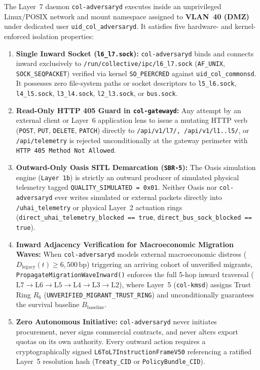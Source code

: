 \begin{invariant}
\label{inv:l7-dmz-containment}
The Layer~7 daemon \texttt{col-adversaryd} executes inside an unprivileged Linux/POSIX network and mount namespace assigned to \textbf{VLAN~40 (DMZ)} under dedicated user \texttt{uid\_col\_adversaryd}. It satisfies five hardware- and kernel-enforced isolation properties:
\begin{enumerate}
    \item \textbf{Single Inward Socket (\texttt{l6\_l7.sock}):} \texttt{col-adversaryd} binds and connects inward exclusively to \texttt{/run/collective/ipc/l6\_l7.sock} (\texttt{AF\_UNIX}, \texttt{SOCK\_SEQPACKET}) verified via kernel \texttt{SO\_PEERCRED} against \texttt{uid\_col\_commonsd}. It possesses zero file-system paths or socket descriptors to \texttt{l5\_l6.sock}, \texttt{l4\_l5.sock}, \texttt{l3\_l4.sock}, \texttt{l2\_l3.sock}, or \texttt{bus.sock}.
    \item \textbf{Read-Only HTTP 405 Guard in \texttt{col-gatewayd}:} Any attempt by an external client or Layer~6 application lens to issue a mutating HTTP verb (\texttt{POST}, \texttt{PUT}, \texttt{DELETE}, \texttt{PATCH}) directly to \texttt{/api/v1/l7/\textit{}, \texttt{/api/v1/l1..l5/}}, or \texttt{/api/telemetry} is rejected unconditionally at the gateway perimeter with \texttt{HTTP 405 Method Not Allowed}.
    \item \textbf{Outward-Only Oasis SITL Demarcation (\texttt{SBR-5}):} The Oasis simulation engine (\texttt{Layer~1b}) is strictly an outward producer of simulated physical telemetry tagged \texttt{QUALITY\_SIMULATED = 0x01}. Neither Oasis nor \texttt{col-adversaryd} ever writes simulated or external packets directly into \texttt{/uhai\_telemetry} or physical Layer~2 actuation rings (\texttt{direct\_uhai\_telemetry\_blocked == true}, \texttt{direct\_bus\_sock\_blocked == true}).
    \item \textbf{Inward Adjacency Verification for Macroeconomic Migration Waves:} When \texttt{col-adversaryd} models external macroeconomic distress ($D_{\mathrm{legacy}}(t) \ge 6{,}500\,\mathrm{bp}$) triggering an arriving cohort of unverified migrants, \texttt{PropagateMigrationWaveInward()} enforces the full 5-hop inward traversal ($\mathrm{L7} \to \mathrm{L6} \to \mathrm{L5} \to \mathrm{L4} \to \mathrm{L3} \to \mathrm{L2}$), where Layer~5 (\texttt{col-kmsd}) assigns Trust Ring $R_6$ (\texttt{UNVERIFIED\_MIGRANT\_TRUST\_RING}) and unconditionally guarantees the survival baseline $B_{\mathrm{baseline}}$.
    \item \textbf{Zero Autonomous Initiative:} \texttt{col-adversaryd} never initiates procurement, never signs commercial contracts, and never alters export quotas on its own authority. Every outward action requires a cryptographically signed \texttt{L6ToL7InstructionFrameV50} referencing a ratified Layer~5 resolution hash (\texttt{Treaty\_CID} or \texttt{PolicyBundle\_CID}).
\end{enumerate}
\end{invariant}

